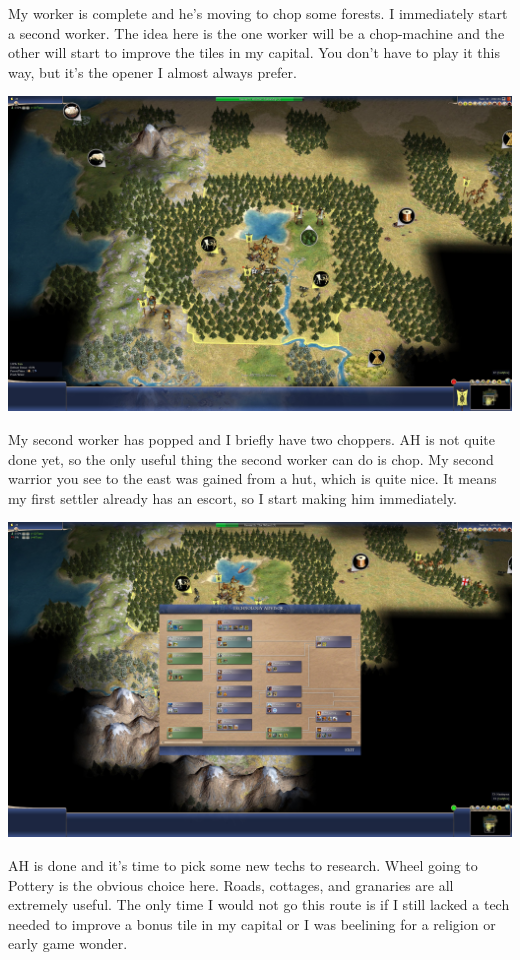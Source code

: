 \documentclass[10pt]{article}
\begin{document}
My worker is complete and he's moving to chop some forests. I immediately start a second worker. The
idea here is the one worker will be a chop-machine and the other will start to improve the tiles in my
capital. You don't have to play it this way, but it's the opener I almost always prefer.

\includegraphics[width=1.0\textwidth]{9}

My second worker has popped and I briefly have two choppers. AH is not quite done yet,
so the only useful thing the second worker can do is chop. My second warrior you see to the east was gained
from a hut, which is quite nice. It means my first settler already has an escort, so I start making him
immediately.

\includegraphics[width=1.0\textwidth]{11}

AH is done and it's time to pick some new techs to research. Wheel going to Pottery is the obvious choice here.
Roads, cottages, and granaries are all extremely useful. The only time I would not go this route is if I still
lacked a tech needed to improve a bonus tile in my capital or I was beelining for a religion or early game wonder.
\end{document}

